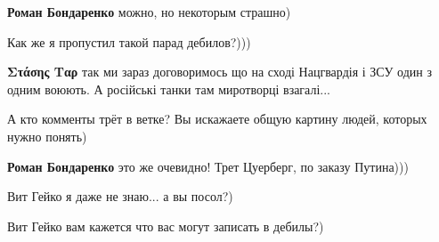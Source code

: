 \begin{itemize}
\begin{itemize}
\textbf{Роман Бондаренко} можно, но некоторым страшно)

 
Как же я пропустил такой парад дебилов?)))

 
\textbf{Στάσης Ταρ} так ми зараз договоримось що на сході Нацгвардія і ЗСУ один з одним воюють. А російські танки там миротворці взагалі...

 
А кто комменты трёт в ветке? Вы искажаете общую картину людей, которых нужно понять)

 
\textbf{Роман Бондаренко} это же очевидно! Трет Цуерберг, по заказу Путина)))

 
Вит Гейко я даже не знаю... а вы посол?)

 
Вит Гейко вам кажется что вас могут записать в дебилы?)


\end{itemize}
\end{itemize}
